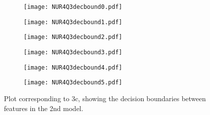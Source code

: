 \begin{figure}[ht]
     \begin{subfigure}{.49\textwidth}
       \centering
    \texttt{[image: NUR4Q3decbound0.pdf]}
    \centering
    \label{}
    \end{subfigure}
    \begin{subfigure}{.49\textwidth}
       \centering
    \texttt{[image: NUR4Q3decbound1.pdf]}
    \centering
    \label{}
    \end{subfigure}
    \hfill
    \begin{subfigure}{.49\textwidth}
       \centering
    \texttt{[image: NUR4Q3decbound2.pdf]}
    \centering
    \label{}
    \end{subfigure}
     \begin{subfigure}{.49\textwidth}
       \centering
    \texttt{[image: NUR4Q3decbound3.pdf]}
    \centering
    \label{}
    \end{subfigure}
     \begin{subfigure}{.49\textwidth}
       \centering
    \texttt{[image: NUR4Q3decbound4.pdf]}
    \centering
    \label{}
    \end{subfigure}
         \begin{subfigure}{.49\textwidth}
       \centering
    \texttt{[image: NUR4Q3decbound5.pdf]}
    \centering
    \label{}
    \end{subfigure}
    \caption{Plot corresponding to 3c, showing the decision boundaries between features in the 2nd model.}
    \label{fig:fig1}
\end{figure}


